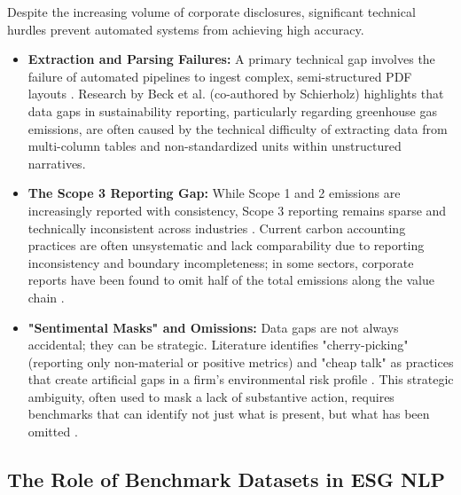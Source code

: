 Despite the increasing volume of corporate disclosures, significant technical hurdles prevent automated systems from achieving high accuracy.
\begin{itemize}
\item 

\textbf{Extraction and Parsing Failures:} A primary technical gap involves the failure of automated pipelines to ingest complex, semi-structured PDF layouts  \parencite{marco_bronzini_bf94d949}. Research by Beck et al.  \parencite{jacob_beck_9548a833} (co-authored by Schierholz) highlights that data gaps in sustainability reporting, particularly regarding greenhouse gas emissions, are often caused by the technical difficulty of extracting data from multi-column tables and non-standardized units within unstructured narratives.\item 

\textbf{The Scope 3 Reporting Gap:} While Scope 1 and 2 emissions are increasingly reported with consistency, Scope 3 reporting remains sparse and technically inconsistent across industries  \parencite{jacob_beck_9548a833}. Current carbon accounting practices are often unsystematic and lack comparability due to reporting inconsistency and boundary incompleteness; in some sectors, corporate reports have been found to omit half of the total emissions along the value chain  \parencite{lena_klaa_en_b073191d}.\item 

\textbf{"Sentimental Masks" and Omissions:} Data gaps are not always accidental; they can be strategic. Literature identifies "cherry-picking" (reporting only non-material or positive metrics) and "cheap talk" as practices that create artificial gaps in a firm’s environmental risk profile  \parencite[]{julia_bingler_6b484913, julia_bingler_268445e3}. This strategic ambiguity, often used to mask a lack of substantive action, requires benchmarks that can identify not just what is present, but what has been omitted  \parencite[]{julia_bingler_268445e3, keane_ong_369a0b63}.
\end{itemize}

\subsection{The Role of Benchmark Datasets in ESG NLP}

